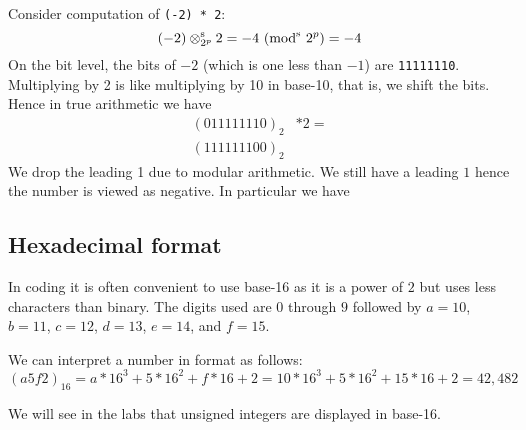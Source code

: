 \begin{example} Consider computation of \texttt{(-2) * 2}:
\[
(-2) \ensuremath{\otimes}_{2^p}^{\rm s} 2 = -4 \ ({\rm mod}^{\rm s}\ 2^p) = -4
\]
On the bit level, the bits of $-2$ (which is one less than $-1$) are \texttt{11111110}. Multiplying by 2 is like multiplying by 10 in base-10, that is, we shift the bits. Hence in true arithmetic we have
\begin{align*}
(0 11111110)_2 & * 2 = \\
(1 11111100)_2&
\end{align*}
We drop the leading 1 due to modular arithmetic. We still have a leading $1$ hence the number is viewed as negative. In particular we have
\end{example}

\subsection{Hexadecimal format}
In coding it is often convenient to use base-16 as it is a power of $2$ but uses less characters than binary. The digits used are $0$ through $9$ followed by $a = 10$, $b = 11$, $c = 12$, $d = 13$, $e = 14$, and $f = 15$. 

\begin{example} We can interpret a number in format as follows:
\[
(a5f2)_{16} = a*16^3 + 5*16^2 + f*16 + 2 = 
10*16^3 + 5*16^2 + 15*16 + 2 = 42,482
\]
\end{example}

We will see in the labs that unsigned integers are displayed in base-16.



